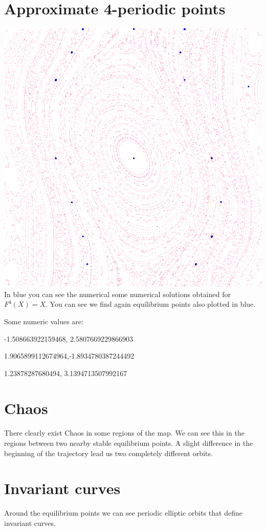 \documentclass[]{scrartcl}
\begin{document}
\section{Approximate 4-periodic points}
\includegraphics[width=\linewidth]{k4.png}
In blue you can see the numerical some numerical solutions obtained for $F^4(X) = X$. You can see we find again equilibrium points also plotted in blue.

Some numeric values are:

-1.508663922159468, 2.5807669229866903

1.9065899112674964,-1.8934780387244492

1.23878287680494, 3.1394713507992167
\section{Chaos}
There clearly exist Chaos in some regions of the map. We can see this in the regions between two nearby stable equilibrium points. A slight difference in the beginning of the trajectory lead us two completely different orbits.
\section{Invariant curves}
Around the equilibrium points we can see periodic elliptic orbits that define invariant curves. 
\end{document}
